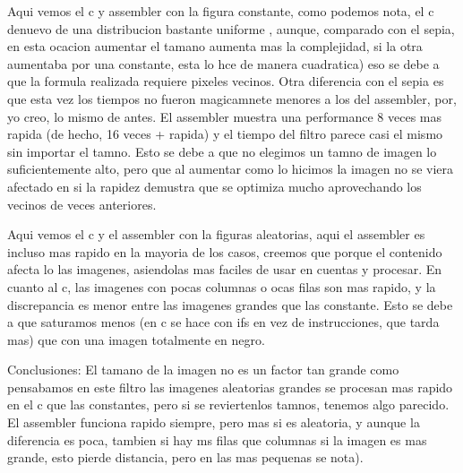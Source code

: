 Aqui vemos el c y assembler con la figura constante, como podemos nota, el c denuevo de una distribucion bastante uniforme , aunque, comparado con el sepia, en esta ocacion aumentar el tamano aumenta mas la complejidad, si la otra aumentaba por una constante, esta lo hce de manera cuadratica) eso se debe a que la formula realizada requiere pixeles vecinos. Otra diferencia con el sepia es que esta vez los tiempos no fueron magicamnete menores a los del assembler, por, yo creo, lo mismo de antes. 
El assembler muestra una performance 8 veces mas rapida (de hecho, 16 veces + rapida) y el tiempo del filtro parece casi el mismo sin importar el tamno. Esto se debe a que no elegimos un tamno de imagen lo suficientemente alto, pero que al aumentar como lo hicimos la imagen no se viera afectado en si la rapidez demustra que se optimiza mucho aprovechando los vecinos de veces anteriores.
\hfill \break


Aqui vemos el c y el assembler con la figuras aleatorias, aqui el assembler es incluso mas rapido en la mayoria de los casos, creemos que porque el contenido afecta lo las imagenes, asiendolas mas faciles de usar en cuentas y procesar. En cuanto al c,   las imagenes con pocas columnas o ocas filas son mas rapido, y la discrepancia es menor entre las imagenes grandes que las constante. Esto se debe a que saturamos menos (en c se hace con ifs en vez de instrucciones, que tarda mas) que con una imagen totalmente en negro. 
\hfill \break




Conclusiones: El tamano de la imagen no es un factor tan grande como pensabamos en este filtro las imagenes aleatorias grandes se procesan mas rapido en  el c que las constantes, pero si se reviertenlos tamnos, tenemos algo parecido. El assembler funciona rapido siempre, pero mas si es aleatoria, y aunque la diferencia es poca, tambien si hay ms filas que columnas si la imagen es mas grande, esto pierde distancia, pero en las mas pequenas se nota).



















